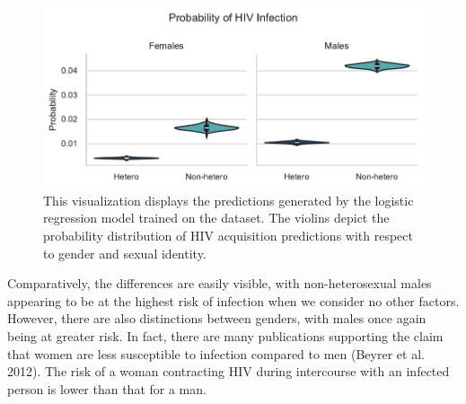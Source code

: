 \documentclass[
  12pt,
  letterpaper,
  DIV=11,
  numbers=noendperiod]{scrartcl}
\begin{document}
\begin{figure}[H]

{\centering \includegraphics{HIVPaper_files/figure-latex/fig-modelsexhetero-output-1.pdf}

}

\caption{\label{fig-modelsexhetero}This visualization displays the
predictions generated by the logistic regression model trained on the
dataset. The violins depict the probability distribution of HIV
acquisition predictions with respect to gender and sexual identity.}

\end{figure}

Comparatively, the differences are easily visible, with non-heterosexual
males appearing to be at the highest risk of infection when we consider
no other factors. However, there are also distinctions between genders,
with males once again being at greater risk. In fact, there are many
publications supporting the claim that women are less susceptible to
infection compared to men (Beyrer et al. 2012). The risk of a woman
contracting HIV during intercourse with an infected person is lower than
that for a man.
\end{document}
